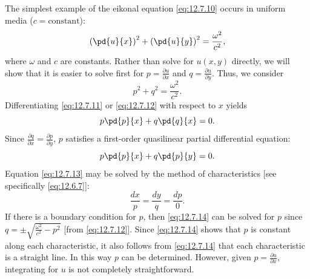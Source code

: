 The simplest example of the eikonal equation \eqref{eq:12.7.10} occurs in uniform media ($c = \text{constant}$):
\begin{equation}
\label{eq:12.7.11}
\left(\pd{u}{x}\right)^2 + \left(\pd{u}{y}\right)^2 = \frac{\omega^2}{c^2},
\end{equation}
where $\omega$ and $c$ are constants.  Rather than solve for $u(x,y)$ directly, we will show that it is easier to solve first for $p = \frac{\partial u}{\partial x}$ and $q = \frac{\partial u}{\partial y}$.  Thus, we consider
\begin{equation}
\label{eq:12.7.12}
p^2 + q^2 = \frac{\omega^2}{c^2}.
\end{equation}
Differentiating \eqref{eq:12.7.11} or \eqref{eq:12.7.12} with respect to $x$ yields
\[
p\pd{p}{x} + q\pd{q}{x} = 0.
\]
Since $\frac{\partial q}{\partial x} = \frac{\partial p}{\partial y}$, $p$ satisfies a first-order quasilinear partial differential equation:
\begin{equation}
\label{eq:12.7.13}
p\pd{p}{x} + q\pd{p}{y} = 0.
\end{equation}
Equation \eqref{eq:12.7.13} may be solved by the method of characteristics [see specifically \eqref{eq:12.6.7}]:
\begin{equation}
\label{eq:12.7.14}
\frac{dx}{p} = \frac{dy}{q} = \frac{dp}{0}.
\end{equation}
If there is a boundary condition for $p$, then \eqref{eq:12.7.14} can be solved for $p$ since $q = \pm\sqrt{\frac{\omega^2}{c^2} - p^2}$ [from \eqref{eq:12.7.12}].  Since \eqref{eq:12.7.14} shows that $p$ is constant along each characteristic, it also follows from \eqref{eq:12.7.14} that each characteristic is a straight line.  In this way $p$ can be determined.  However, given $p = \frac{\partial u}{\partial x}$, integrating for $u$ is not completely straightforward.

